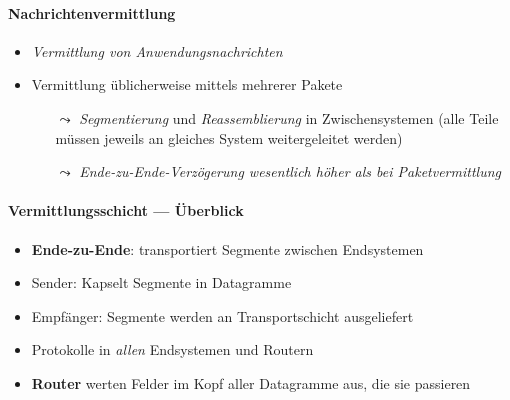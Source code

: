 \paragraph{Nachrichtenvermittlung}
\begin{itemize}
  \item \emph{Vermittlung von Anwendungsnachrichten}
  \item Vermittlung üblicherweise mittels mehrerer Pakete
  \begin{itemize}
    \item[\( \leadsto \)] \emph{Segmentierung} und \emph{Reassemblierung} in Zwischensystemen (alle Teile müssen jeweils an gleiches System weitergeleitet werden)
    \item[\( \leadsto \)] \emph{Ende-zu-Ende-Verzögerung wesentlich höher als bei Paketvermittlung}
  \end{itemize}
\end{itemize}

\paragraph{Vermittlungsschicht --- Überblick}
\begin{itemize}
  \item \textbf{Ende-zu-Ende}: transportiert Segmente zwischen Endsystemen
  \item Sender: Kapselt Segmente in Datagramme
  \item Empfänger: Segmente werden an Transportschicht ausgeliefert
  \item Protokolle in \emph{allen} Endsystemen und Routern
  \item \textbf{Router} werten Felder im Kopf aller Datagramme aus, die sie passieren
\end{itemize}

